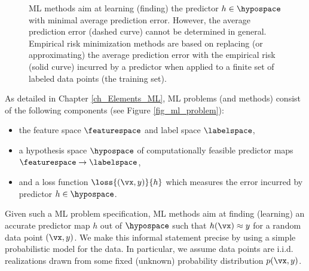 \documentclass[12pt]{report}
\begin{document}
\begin{figure}[htbp]
\begin{center}
     \vspace*{-4mm}
\end{center}
\caption{ML methods aim at learning (finding) the predictor $h \in \hypospace$ with minimal 
average prediction error. However, the average prediction error (dashed curve) cannot be 
determined in general. Empirical risk minimization methods are based on replacing (or approximating) 
the average prediction error with the empirical risk (solid curve) incurred by a predictor when 
applied to a finite set of labeled data points (the training set).}
\label{fig_ERM_idea}
\end{figure}


As detailed in Chapter \ref{ch_Elements_ML}, ML problems (and methods) consist of the following 
components (see Figure \ref{fig_ml_problem}): 
\begin{itemize} 
\item the feature space $\featurespace$ and label space $\labelspace$, 
\item a hypothesis space $\hypospace$ of computationally feasible predictor maps $\featurespace \rightarrow \labelspace$, 
\item and a loss function $\loss{(\vx,y)}{h}$ which measures the error incurred by predictor $h \in \hypospace$. 
\end{itemize} 
Given such a ML problem specification, ML methods aim at finding (learning) an accurate predictor 
map $h$ out of $\hypospace$ such that $h(\vx) \approx y$ for a random data point $(\vx,y)$. We 
make this informal statement precise by using a simple probabilistic model for the data. In particular, 
we assume data points are i.i.d. realizations drawn from some fixed (unknown) probability distribution $p(\vx,y)$. 
\end{document}
